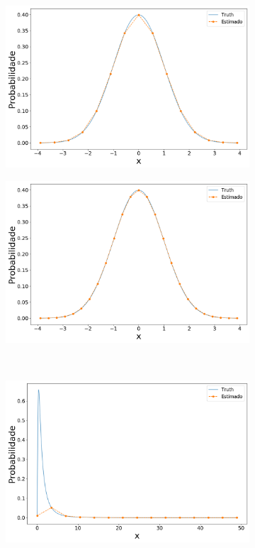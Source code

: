\begin{figure}[ht]
	\centering
	\begin{subfigure}[b]{0.45\textwidth}
		\centering 
		\includegraphics[width=\linewidth]{./figuras/Linspace_normal_15}
		\caption{}
		\label{fig:lin_norm15}
	\end{subfigure}
	\hfill
	\begin{subfigure}[b]{0.45\textwidth}
		\centering 
		\includegraphics[width=\linewidth]{./figuras/Linspace_normal_25}
		\caption{}
		\label{fig:lin_norm25}
	\end{subfigure}
	\\
	\begin{subfigure}[b]{0.45\textwidth}
		\centering 
		\includegraphics[width=\linewidth]{./figuras/Linspace_lognormal_15}

\end{subfigure}
\end{figure}
